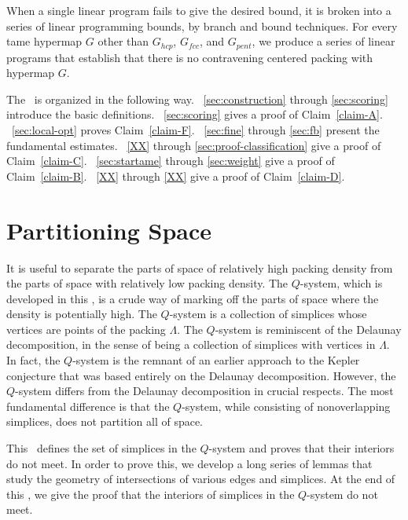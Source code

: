 When a single linear program fails to give the desired bound, it
is broken into a series of linear programming bounds, by branch
and bound techniques.  For every tame hypermap $G$ other than
$G_{hcp}$, $G_{fcc}$, and $G_{pent}$, we
produce a series of linear programs that establish that there is
no contravening centered packing with hypermap $G$.

The \paper~is organized in the following way.
\Chaps~\ref{sec:construction} through \ref{sec:scoring} introduce
the basic definitions.  \Chap~\ref{sec:scoring} gives a proof of
Claim~\ref{claim-A}. \Chap~\ref{sec:local-opt} proves
Claim~\ref{claim-F}. \Chaps~\ref{sec:fine} through \ref{sec:fb}
present the fundamental estimates. \Chaps~\ref{XX}
through \ref{sec:proof-classification} give a proof of
Claim~\ref{claim-C}. \Chaps~\ref{sec:startame} through
\ref{sec:weight} give a proof of Claim~\ref{claim-B}.
\Chaps~\ref{XX} through \ref{XX} give
a proof of Claim~\ref{claim-D}.


\chapter{Partitioning Space}





It is useful to separate the parts of space of relatively high
packing density from the parts of space with relatively low
packing density.  The $Q$-system, which is developed in this
\chap, is a crude way of marking off the parts of space where the
density is potentially high.  The $Q$-system is a collection of
simplices whose vertices are points of the packing $\Lambda$. The
$Q$-system is reminiscent of the Delaunay decomposition, in the
sense of being a collection of simplices with vertices in
$\Lambda$.  In fact, the $Q$-system is the remnant of an earlier
approach to the Kepler conjecture that was based entirely on the
Delaunay decomposition.  However, the $Q$-system differs from the
Delaunay decomposition in crucial respects.  The most fundamental
difference is that the $Q$-system, while consisting of
nonoverlapping simplices, does not partition all of space.

This \chap\ defines the set of simplices in the $Q$-system and
proves that their interiors do not meet.  In order to prove this,
we develop a long series of lemmas that study the geometry of
intersections of various edges and simplices.  At the end of this
\chap, we give the proof that the interiors of simplices in the
$Q$-system do not meet.



